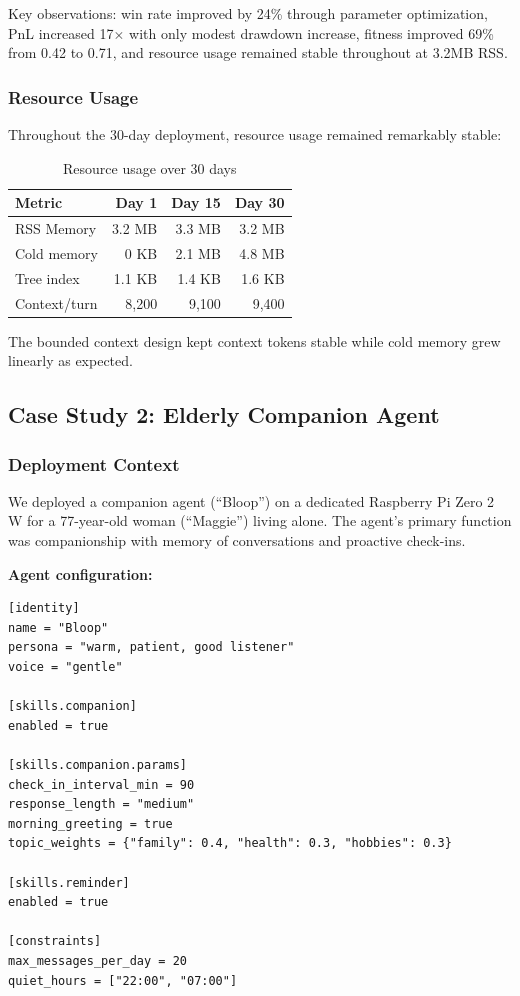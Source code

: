 \documentclass[conference]{IEEEtran}
\begin{document}
Key observations: win rate improved by 24\% through parameter optimization, PnL increased 17$\times$ with only modest drawdown increase, fitness improved 69\% from 0.42 to 0.71, and resource usage remained stable throughout at 3.2MB RSS.

\subsubsection{Resource Usage}

Throughout the 30-day deployment, resource usage remained remarkably stable:

\begin{table}[h]
\centering
\caption{Resource usage over 30 days}
\label{tab:pi_resources}
\begin{tabular}{lrrr}
\toprule
\textbf{Metric} & \textbf{Day 1} & \textbf{Day 15} & \textbf{Day 30} \\
\midrule
RSS Memory & 3.2 MB & 3.3 MB & 3.2 MB \\
Cold memory & 0 KB & 2.1 MB & 4.8 MB \\
Tree index & 1.1 KB & 1.4 KB & 1.6 KB \\
Context/turn & 8,200 & 9,100 & 9,400 \\
\bottomrule
\end{tabular}
\end{table}

The bounded context design kept context tokens stable while cold memory grew linearly as expected.

\subsection{Case Study 2: Elderly Companion Agent}

\subsubsection{Deployment Context}

We deployed a companion agent (``Bloop'') on a dedicated Raspberry Pi Zero 2 W for a 77-year-old woman (``Maggie'') living alone. The agent's primary function was companionship with memory of conversations and proactive check-ins.

\textbf{Agent configuration:}
\begin{lstlisting}[style=tomlcode]
[identity]
name = "Bloop"
persona = "warm, patient, good listener"
voice = "gentle"

[skills.companion]
enabled = true

[skills.companion.params]
check_in_interval_min = 90
response_length = "medium"
morning_greeting = true
topic_weights = {"family": 0.4, "health": 0.3, "hobbies": 0.3}

[skills.reminder]
enabled = true

[constraints]
max_messages_per_day = 20
quiet_hours = ["22:00", "07:00"]
\end{lstlisting}
\end{document}
